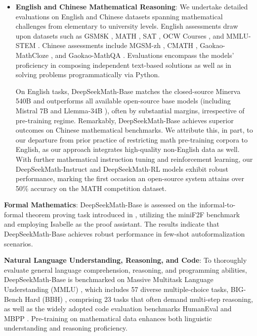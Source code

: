 \begin{itemize}[topsep=0pt]
    \item \textbf{English and Chinese Mathematical Reasoning}: We undertake detailed evaluations on English and Chinese datasets spanning mathematical challenges from elementary to university levels. English assessments draw upon datasets such as GSM8K \citep{gsm8k}, MATH \citep{MATH}, SAT \citep{llemma}, OCW Courses \citep{minerva}, and MMLU-STEM \citep{mmlu}. Chinese assessments include MGSM-zh \citep{mgsm}, CMATH \citep{wei2023cmath}, Gaokao-MathCloze \citep{agieval}, and Gaokao-MathQA \citep{agieval}. Evaluations encompass the models' proficiency in composing independent text-based solutions as well as in solving problems programmatically via Python.

    On English tasks, DeepSeekMath-Base matches the closed-source Minerva 540B \citep{minerva} and outperforms all available open-source base models (including Mistral 7B \citep{mistral} and Llemma-34B \citep{llemma}), often by substantial margins, irrespective of pre-training regime. Remarkably, DeepSeekMath-Base achieves superior outcomes on Chinese mathematical benchmarks. We attribute this, in part, to our departure from prior practice \citep{minerva,llemma} of restricting math pre-training corpora to English, as our approach integrates high-quality non-English data as well. With further mathematical instruction tuning and reinforcement learning, our DeepSeekMath-Instruct and DeepSeekMath-RL models exhibit robust performance, marking the first occasion an open-source system attains over 50\% accuracy on the MATH competition dataset.
\end{itemize}

\item \textbf{Formal Mathematics}: DeepSeekMath-Base is assessed on the informal-to-formal theorem proving task introduced in \citep{dsp_proof}, utilizing the miniF2F benchmark \citep{minif2f} and employing Isabelle \citep{isabelle} as the proof assistant. The results indicate that DeepSeekMath-Base achieves robust performance in few-shot autoformalization scenarios.
\item \textbf{Natural Language Understanding, Reasoning, and Code}: To thoroughly evaluate general language comprehension, reasoning, and programming abilities, DeepSeekMath-Base is benchmarked on Massive Multitask Language Understanding (MMLU) \citep{mmlu}, which includes 57 diverse multiple-choice tasks, BIG-Bench Hard (BBH) \citep{bbh}, comprising 23 tasks that often demand multi-step reasoning, as well as the widely adopted code evaluation benchmarks HumanEval \citep{codex} and MBPP \citep{mbpp}. Pre-training on mathematical data enhances both linguistic understanding and reasoning proficiency.

